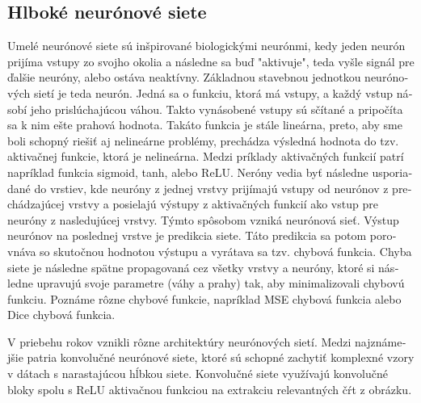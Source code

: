 \begin{otherlanguage}{slovak}
\subsection{Hlboké neurónové siete}
Umelé neurónové siete sú inšpirované biologickými neurónmi, kedy jeden neurón prijíma vstupy zo svojho okolia a následne sa buď "aktivuje", teda vyšle signál pre ďalšie neuróny, alebo ostáva neaktívny. Základnou stavebnou jednotkou neurónových sietí je teda neurón. Jedná sa o funkciu, ktorá má vstupy, a každý vstup násobí jeho prislúchajúcou váhou. Takto vynásobené vstupy sú sčítané a pripočíta sa k nim ešte prahová hodnota. Takáto funkcia je stále lineárna, preto, aby sme boli schopný riešiť aj nelineárne problémy, prechádza výsledná hodnota do tzv. aktivačnej funkcie, ktorá je nelineárna. Medzi príklady aktivačných funkcií patrí napríklad funkcia sigmoid, tanh, alebo ReLU. Neróny vedia byť následne usporiadané do vrstiev, kde neuróny z jednej vrstvy prijímajú vstupy od neurónov z prechádzajúcej vrstvy a posielajú výstupy z aktivačných funkcií ako vstup pre neuróny z nasledujúcej vrstvy. Týmto spôsobom vzniká neurónová sieť. Výstup neurónov na poslednej vrstve je predikcia siete. Táto predikcia sa potom porovnáva so skutočnou hodnotou výstupu a vyrátava sa tzv. chybová funkcia. Chyba siete je následne spätne propagovaná cez všetky vrstvy a neuróny, ktoré si následne upravujú svoje parametre (váhy a prahy) tak, aby minimalizovali chybovú funkciu. Poznáme rôzne chybové funkcie, napríklad MSE chybová funkcia alebo Dice chybová funkcia.

V priebehu rokov vznikli rôzne architektúry neurónových sietí. Medzi najznámejšie patria konvolučné neurónové siete, ktoré sú schopné zachytiť komplexné vzory v dátach s narastajúcou hĺbkou siete. Konvolučné siete využívajú konvolučné bloky spolu s ReLU aktivačnou funkciou na extrakciu relevantných čŕt z obrázku.


\end{otherlanguage}
